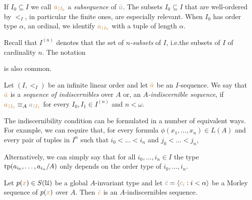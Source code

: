 If $I_0\subseteq I$ we call ${\color{brown} a_{\restriction I_0}}$ a \emph{subsequence\/} of ${\color{brown}\bar a}$.
The subsets $I_0\subseteq I$ that are well-ordered by $<_I$, in particular the finite ones, are especially relevant.
When $I_0$ has order type $\alpha$, an ordinal, we identify ${\color{brown} a_{\restriction I_0}}$ with a tuple of length $\alpha$.

Recall that \emph{$I^{(n)}$} denotes that the set of \emph{$n$-subsets\/} of $I$,  i.e.\@ the subsets of $I$ of cardinality $n$.
The notation \smallskip


is also common.
\begin{definition}
Let $(I,<_I)$ be an infinite linear order and let ${\color{brown}\bar a}$ be an $I$-sequence.
We say that ${\color{brown}\bar a}$ is a \emph{sequence of indiscernibles\/} over $A$ or, an \emph{$A$-indiscernible sequence\/}, if ${\color{brown} a_{\restriction I_0}}\equiv_A {\color{brown} a_{\restriction I_1}}$ for every $I_0,I_1\in I^{(n)}$ and $n<\omega$.

\end{definition}

The indiscernibility condition can be formulated in a number of equivalent ways.
For example, we can require that, for every formula $\phi(x_1,\dots,x_n)\in L(A)$ and every pair of tuples in $I^n$ such that $i_0<\dots<i_n$ and $j_0<\dots<j_n$,



Alternatively, we can simply say that for all $i_0,\dots,i_n\in I$ the type ${\rm tp}(a_{i_0},\dots,a_{i_n}/A)$ only depends on the order type of $i_0,\dots,i_n$.

\begin{proposition}
Let $p({\color{brown} x})\in S(\EuScript U)$ be a global $A$-invariant type and let ${\color{brown}\bar c}=\langle{\color{brown}c_i}:i<\alpha\rangle$ be a Morley sequence of $p({\color{brown} x})$ over $A$.
Then ${\color{brown}\bar c}$ is an $A$-indiscernibles sequence.
\end{proposition}

